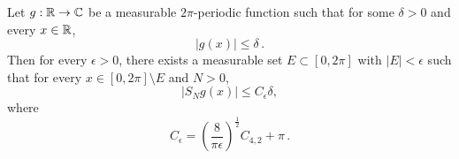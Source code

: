 \begin{lemma}
    \label{partial-Fourier-sums-of-small}
    \leanok
    Let $g:{\mathbb{R}}\to\mathbb{C}$ be a measurable $2\pi$-periodic function such that for some $\delta>0$ and every $x\in{\mathbb{R}}$,
    \begin{equation} \label{g-small}
        |g(x)|\le \delta \,.
    \end{equation}
    Then for every $\epsilon>0$, there exists a measurable set $E\subset [0,2\pi]$ with $|E|<\epsilon$ such that for every $x\in [0,2\pi]\setminus E$ and $N>0$,
    \begin{equation}  \label{S-Ng-small}
        |S_N g(x)|\le C_\epsilon \delta,
    \end{equation}
    where
    \begin{equation} \label{C-epsilon-def}
        C_\epsilon = \left(\frac{8}{\pi\epsilon}\right)^\frac{1}{2} C_{4,2} + \pi \,.
    \end{equation}
\end{lemma}

